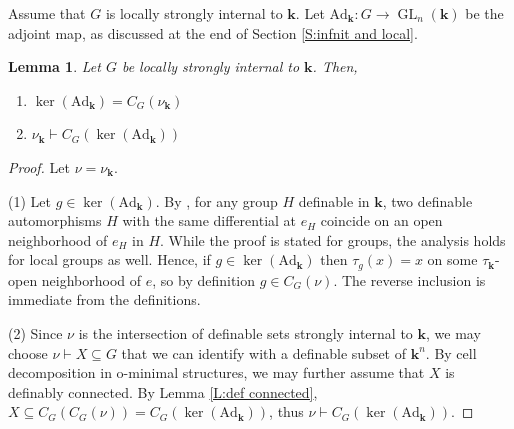 \documentclass[11pt]{amsart}
\DeclareMathOperator{\gl}{GL} \DeclareMathOperator{\agl}{AGL}
\newtheorem{lemma}[theorem]{Lemma}
\theoremstyle{definition}
\newcommand{\bk}{\textbf{k}}
\newcommand{\0}{\emptyset}
\newcommand{\ad}{\mathrm{Ad}}
\def\sub{\subseteq}
\begin{document}
Assume that $G$ is locally strongly internal to $\bk$. 
Let $\ad_{\bk}:G\to \gl_n(\bk)$ be the adjoint map, as discussed at the end of Section  \ref{S:infnit and local}. 

\begin{lemma}\label{L:kerad in o-minimal}
Let $G$ be locally strongly internal to $\bk$. Then,
\begin{enumerate}
    \item $\ker(\ad_{\bk})=C_G(\nu_\bk)$
    \item $\nu_\bk\vdash C_G(\ker(\ad_{\bk}))$
\end{enumerate}
\end{lemma}
\begin{proof}
    Let $\nu=\nu_\bk$.
    
    (1) Let $g\in \ker(\ad_{\bk})$. By \cite[Lemma 3.2(ii)]{OtPePi}, for any group $H$ definable in $\bk$,  two definable automorphisms $H$ with the same differential at $e_H$ coincide on an open neighborhood of $e_H$ in $H$. While the proof is stated for groups, the analysis holds for local groups as well. Hence, if $g\in \ker(\ad_\bk)$ then $\tau_g(x)=x$ on some $\tau_{\bk}$-open neighborhood of $e$, so by definition $g \in C_G(\nu)$. The reverse inclusion is immediate from the  definitions.
    
    

    (2) Since $\nu$ is the intersection of definable sets strongly internal to $\bk$, we may choose $\nu\vdash X\sub G$  that we can identify with a definable subset of $\bk^n$.  By cell decomposition in o-minimal structures, we may further assume that $X$ is definably connected.   By Lemma \ref{L:def connected}, $X\subseteq C_G(C_G(\nu))=C_G(\ker(\ad_\bk))$, thus $\nu\vdash C_G(\ker (\ad_{\bk}))$.
\end{proof}
\end{document}
